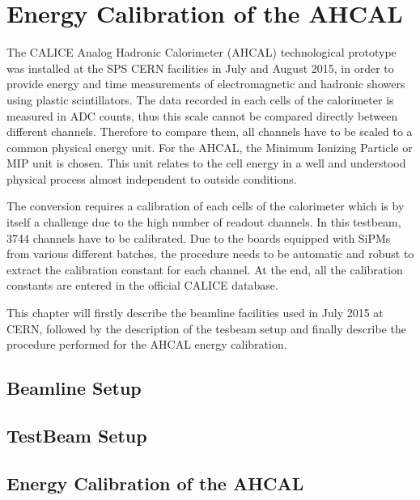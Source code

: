\chapter{Energy Calibration of the AHCAL}
\label{chap:ECalibAHCAL}

The CALICE Analog Hadronic Calorimeter (AHCAL) technological prototype was installed at the SPS CERN facilities in July and August 2015, in order to provide energy and time measurements of electromagnetic and hadronic showers using plastic scintillators. The data recorded in each cells of the calorimeter is measured in ADC counts, thus this scale cannot be compared directly between different channels. Therefore to compare them, all channels have to be scaled to a common physical energy unit. For the AHCAL, the Minimum Ionizing Particle or MIP unit is chosen. This unit relates to the cell energy in a well and understood physical process almost independent to outside conditions.

The conversion requires a calibration of each cells of the calorimeter which is by itself a challenge due to the high number of readout channels. In this testbeam, 3744 channels have to be calibrated. Due to the boards equipped with SiPMs from various different batches, the procedure needs to be automatic and robust to extract the calibration constant for each channel. At the end, all the calibration constants are entered in the official CALICE database.

This chapter will firstly describe the beamline facilities used in July 2015 at CERN, followed by the description of the tesbeam setup and finally describe the procedure performed for the AHCAL energy calibration.

\section{Beamline Setup}

\section{TestBeam Setup}

\section{Energy Calibration of the AHCAL}
